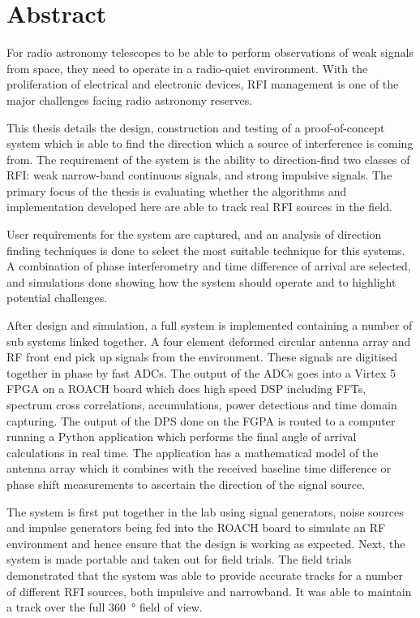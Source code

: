 \chapter{Abstract}

For radio astronomy telescopes to be able to perform observations of weak signals from space, they need to operate in a radio-quiet environment. With the proliferation of electrical and electronic devices, RFI management is one of the major challenges facing radio astronomy reserves. 

This thesis details the design, construction and testing of a proof-of-concept system which is able to find the direction which a source of interference is coming from. The requirement of the system is the ability to direction-find two classes of RFI: weak narrow-band continuous signals, and strong impulsive signals. The primary focus of the thesis is evaluating whether the algorithms and implementation developed here are able to track real RFI sources in the field.

User requirements for the system are captured, and an analysis of direction finding techniques is done to select the most suitable technique for this systems. A combination of phase interferometry and time difference of arrival are selected, and simulations done showing how the system should operate and to highlight potential challenges.

After design and simulation, a full system is implemented containing a number of sub systems linked together. A four element deformed circular antenna array and RF front end pick up signals from the environment. These signals are digitised together in phase by fast ADCs. The output of the ADCs goes into a Virtex 5 FPGA on a ROACH board which does high speed DSP including FFTs, spectrum cross correlations, accumulations, power detections and time domain capturing. The output of the DPS done on the FGPA is routed to a computer running a Python application which performs the final angle of arrival calculations in real time. The application has a mathematical model of the antenna array which it combines with the received baseline time difference or phase shift measurements to ascertain the direction of the signal source.

The system is first put together in the lab using signal generators, noise sources and impulse generators being fed into the ROACH board to simulate an RF environment and hence ensure that the design is working as expected. Next, the system is made portable and taken out for field trials. The field trials demonstrated that the system was able to provide accurate tracks for a number of different RFI sources, both impulsive and narrowband. It was able to maintain a track over the full \SI{360}{\degree} field of view.
